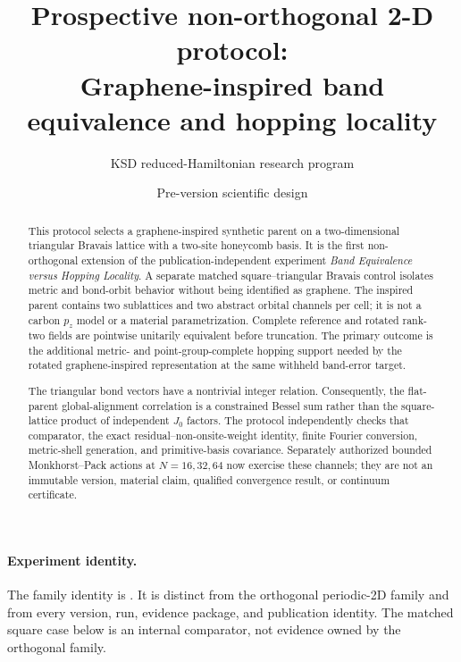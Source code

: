 \documentclass[11pt]{article}
\title{\textbf{Prospective non-orthogonal 2-D protocol:\\
Graphene-inspired band equivalence and hopping locality}}
\author{KSD reduced-Hamiltonian research program}
\date{Pre-version scientific design}
\begin{document}
\maketitle

\begin{abstract}
This protocol selects a graphene-inspired synthetic parent on a two-dimensional
triangular Bravais lattice with a two-site honeycomb basis.  It is the first
non-orthogonal extension of the publication-independent experiment \emph{Band
Equivalence versus Hopping Locality}.  A separate matched square--triangular Bravais
control isolates metric and bond-orbit behavior without being identified as graphene.
The inspired parent contains two sublattices and two abstract orbital channels per cell;
it is not a carbon $p_z$ model or a material parametrization.  Complete reference and
rotated rank-two fields are pointwise unitarily equivalent before truncation.  The
primary outcome is the additional metric- and point-group-complete hopping support
needed by the rotated graphene-inspired representation at the same withheld band-error
target.

The triangular bond vectors have a nontrivial integer relation.  Consequently, the
flat-parent global-alignment correlation is a constrained Bessel sum rather than the
square-lattice product of independent $J_0$ factors.  The protocol independently checks
that comparator, the exact residual--non-onsite-weight identity, finite Fourier
conversion, metric-shell generation, and primitive-basis covariance.  Separately
authorized bounded Monkhorst--Pack actions at $N=16,32,64$ now exercise these channels;
they are not an immutable version, material claim, qualified convergence result, or
continuum certificate.
\end{abstract}

\paragraph{Experiment identity.}
The family identity is
.
It is distinct from the orthogonal periodic-2D family and from every version, run,
evidence package, and publication identity.  The matched square case below is an
internal comparator, not evidence owned by the orthogonal family.
\end{document}
